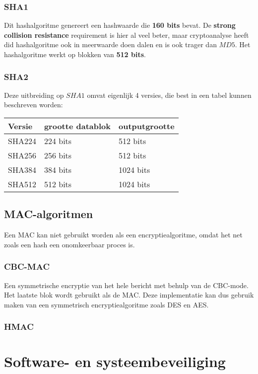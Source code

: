 \documentclass{report}
\begin{document}
	\subsection{SHA1}
	Dit hashalgoritme genereert een hashwaarde die \textbf{160 bits} bevat. De \textbf{strong collision resistance} requirement is hier al veel beter, maar cryptoanalyse heeft did hashalgoritme ook in meerwaarde doen dalen en is ook trager dan $MD5$. Het hashalgoritme werkt op blokken van \textbf{512 bits}.
	\subsection{SHA2}
	Deze uitbreiding op $SHA1$ omvat eigenlijk 4 versies, die best in een tabel kunnen beschreven worden:
	\begin{table}[ht]
		\centering
		\begin{tabular}{l | l | l}
			Versie & grootte datablok & outputgrootte \\
			\hline
			SHA224 & 224 bits & 512 bits \\
			SHA256 & 256 bits & 512 bits \\
			SHA384 & 384 bits & 1024 bits \\
			SHA512 & 512 bits & 1024 bits \\
		\end{tabular}
	\end{table}


	\section{MAC-algoritmen}
	Een MAC kan niet gebruikt worden als een encryptiealgoritme, omdat het net zoals een hash een onomkeerbaar proces is. 
	\subsection{CBC-MAC}
	Een symmetrische encryptie van het hele bericht met behulp van de CBC-mode. Het laatste blok wordt gebruikt als de MAC. Deze implementatie kan dus gebruik maken van een symmetrisch encryptiealgoritme zoals DES en AES.
	\subsection{HMAC}

	\chapter{Software- en systeembeveiliging}
\end{document}
